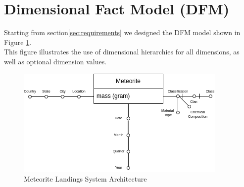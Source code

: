 \documentclass[conference]{IEEEtran}
\begin{document}
	\section{Dimensional Fact Model (DFM)}
	Starting from section\ref{sec:requirements} we designed the DFM model shown in Figure \ref{fig:Meteorite Landings System Architecture}. \\This figure illustrates the use of dimensional hierarchies for all dimensions, as well as optional dimension values.
	\begin{figure}[htpb]
		\centering
		\includegraphics[width=\columnwidth]{images/dfm_schema.png}
		\caption{Meteorite Landings System Architecture}
		\label{fig:Meteorite Landings System Architecture}
	\end{figure}
\end{document}
